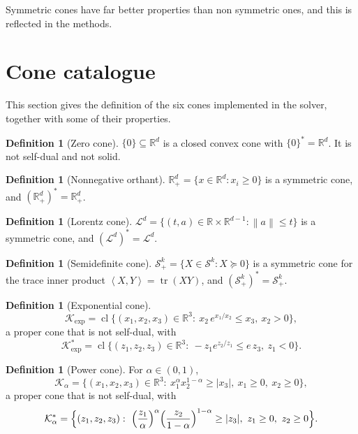 \documentclass[a4paper,11pt]{book}
\theoremstyle{plain}
\theoremstyle{definition}
\newtheorem{definition}[theorem]{Definition}
\theoremstyle{remark}
\numberwithin{equation}{chapter}
\numberwithin{algorithm}{chapter}
\newcommand{\R}{\mathbb{R}}
\newcommand{\Sp}{\mathcal{S}}
\newcommand{\norm}[1]{\left\|#1\right\|}
\newcommand{\inner}[2]{\left\langle #1, #2 \right\rangle}
\newcommand{\tr}{\operatorname{tr}}
\newcommand{\Kexp}{\mathcal{K}_{\exp}}
\newcommand{\Kpow}{\mathcal{K}_{\alpha}}
\newcommand{\Lor}{\mathcal{L}}
\begin{document}
	Symmetric cones have far better properties than non symmetric ones, and this
	is reflected in the methods.
	
	\section{Cone catalogue}
	
	This section gives the definition of the six cones implemented in the solver,
	together with some of their properties.
	\begin{definition}[Zero cone]
		$\{0\}\subseteq\R^d$ is a closed convex cone with $\{0\}^*=\R^d$. It is not
		self-dual and not solid.
	\end{definition}
	
	\begin{definition}[Nonnegative orthant]
		$\R^d_+=\{x\in\R^d:x_i\geq0\}$ is a symmetric cone, and $(\R^d_+)^*=\R^d_+$.
	\end{definition}
	
	\begin{definition}[Lorentz cone]
		$\Lor^d=\{(t,a)\in\R\times\R^{d-1}:\norm{a}\leq t\}$ is a symmetric cone, and
		$(\Lor^d)^*=\Lor^d$.
	\end{definition}
	
	\begin{definition}[Semidefinite cone]
		$\Sp^k_+=\{X\in\Sp^k:X\succeq0\}$ is a symmetric cone for the trace inner
		product $\inner{X}{Y}=\tr(XY)$, and $(\Sp^k_+)^*=\Sp^k_+$.
	\end{definition}
	
	\begin{definition}[Exponential cone]
		\begin{equation}
			\Kexp=\operatorname{cl}\bigl\{(x_1,x_2,x_3)\in\R^3:\
			x_2\,e^{x_1/x_2}\leq x_3,\ x_2>0\bigr\} ,
		\end{equation}
		a proper cone that is not self-dual, with
		\begin{equation}
			\Kexp^*=\operatorname{cl}\bigl\{(z_1,z_2,z_3)\in\R^3:\
			-z_1e^{z_2/z_1}\leq e\,z_3,\ z_1<0\bigr\} .
		\end{equation}
	\end{definition}
	
	\begin{definition}[Power cone]
		For $\alpha\in(0,1)$,
		\begin{equation}
			\Kpow=\bigl\{(x_1,x_2,x_3)\in\R^3:\
			x_1^{\alpha}x_2^{1-\alpha}\geq|x_3|,\ x_1\geq0,\ x_2\geq0\bigr\} ,
		\end{equation}
		a proper cone that is not self-dual, with
		\begin{equation}
			\Kpow^*=\Bigl\{(z_1,z_2,z_3):\
			\Bigl(\frac{z_1}{\alpha}\Bigr)^{\alpha}
			\Bigl(\frac{z_2}{1-\alpha}\Bigr)^{1-\alpha}\geq|z_3|,\
			z_1\geq0,\ z_2\geq0\Bigr\} .
		\end{equation}
	\end{definition}
	
\end{document}
